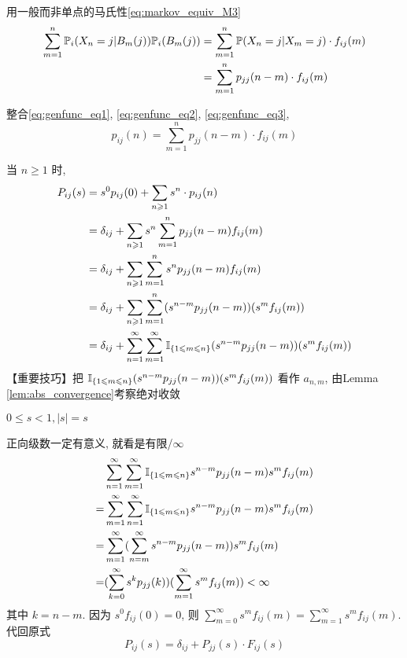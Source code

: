 用一般而非单点的马氏性\eqref{eq:markov_equiv_M3}
\begin{equation}
\begin{aligned}
    \sum_{m=1}^n\mathbb{P}_i(X_n=j|B_m(j))\mathbb{P}_i(B_m(j))&=\sum_{m=1}^n\mathbb{P}(X_n=j|X_m=j)\cdot f_{ij}(m)\\
    &=\sum_{m=1}^n p_{jj}(n-m)\cdot f_{ij}(m)
\end{aligned}
\label{eq:genfunc_eq3}
\end{equation}

整合\eqref{eq:genfunc_eq1}, \eqref{eq:genfunc_eq2}, \eqref{eq:genfunc_eq3},
\begin{equation}
p_{ij}(n)=\sum_{m=1}^n p_{jj}(n-m)\cdot f_{ij}(m)
\label{eq:genfunc_eq4}
\end{equation}

当 $n\geq 1$ 时, 
\[
\begin{aligned}
    P_{ij}(s)&=s^0p_{ij}(0)+\sum_{n\geqslant 1}s^n\cdot p_{ij}(n)\\
    &=\delta_{ij}+\sum_{n\geqslant 1}s^n\sum_{m=1}^n p_{jj}(n-m)f_{ij}(m)\\
    &=\delta_{ij}+\sum_{n\geqslant 1}\sum_{m=1}^n s^n p_{jj}(n-m)f_{ij}(m)\\
    &=\delta_{ij}+\sum_{n\geqslant 1}\sum_{m=1}^n(s^{n-m}p_{jj}(n-m))(s^m f_{ij}(m))\\
    &=\delta_{ij}+\sum_{n=1}^{\infty}\sum_{m=1}^{\infty}\mathbb I_{\{1\leqslant m\leqslant n\}}(s^{n-m}p_{jj}(n-m))(s^m f_{ij}(m))
\end{aligned}
\]
【重要技巧】把 $\mathbb I_{\{1\leqslant m\leqslant n\}}(s^{n-m}p_{jj}(n-m))(s^m f_{ij}(m))$ 看作 $a_{n,m}$, 由Lemma \ref{lem:abs_convergence}考察绝对收敛

$0\leq s<1, |s|=s$

正向级数一定有意义, 就看是有限/$\infty$
\[
\begin{aligned}
    &\sum_{n=1}^{\infty}\sum_{m=1}^{\infty}\mathbb I_{\{1\leqslant m\leqslant n\}}s^{n-m}p_{jj}(n-m)s^m f_{ij}(m)\\
    =&\sum_{m=1}^{\infty}\sum_{n=1}^{\infty}\mathbb I_{\{1\leqslant m\leqslant n\}}s^{n-m}p_{jj}(n-m)s^m f_{ij}(m)\\
    =&\sum_{m=1}^{\infty}(\sum_{n=m}^{\infty}s^{n-m}p_{jj}(n-m))s^m f_{ij}(m)\\
    =&(\sum_{k=0}^{\infty}s^{k}p_{jj}(k))(\sum_{m=1}^{\infty}s^m f_{ij}(m))<\infty
\end{aligned}
\]
其中 $k=n-m$. 因为 $s^0f_{ij}(0)=0$, 则 $\sum_{m=0}^{\infty}s^m f_{ij}(m)=\sum_{m=1}^{\infty}s^m f_{ij}(m)$.代回原式
\[
P_{ij}(s)=\delta_{ij}+P_{jj}(s)\cdot F_{ij}(s)
\]

